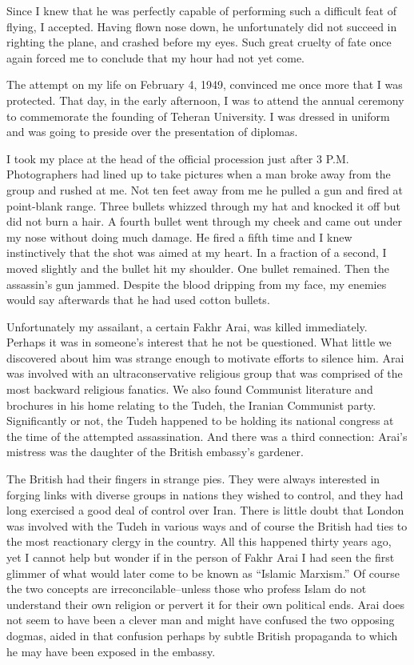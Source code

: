 Since I knew that he was perfectly capable of performing such a difficult feat of flying, I accepted. Having flown nose down, he unfortunately did not succeed in righting the plane, and crashed before my eyes. Such great cruelty of fate once again forced me to conclude that my hour had not yet come. 

The attempt on my life on February 4, 1949, convinced me once more that I was protected. That day, in the early afternoon, I was to attend the annual ceremony to commemorate the founding of Teheran University. I was dressed in uniform and was going to preside over the presentation of diplomas. 

I took my place at the head of the official procession just after 3 P.M. Photographers had lined up to take pictures when a man broke away from the group and rushed at me. Not ten feet away from me he pulled a gun and fired at point-blank range. Three bullets whizzed through my hat and knocked it off but did not burn a hair. A fourth bullet went through my cheek and came out under my nose without doing much damage. He fired a fifth time and I knew instinctively that the shot was aimed at my heart. In a fraction of a second, I moved slightly and the bullet hit my shoulder. One bullet remained. Then the assassin's gun jammed. Despite the blood dripping from my face, my enemies would say afterwards that he had used cotton bullets. 

Unfortunately my assailant, a certain Fakhr Arai, was killed immediately. Perhaps it was in someone's interest that he not be questioned. What little we discovered about him was strange enough to motivate efforts to silence him. Arai was involved with an ultraconservative religious group that was comprised of the most backward religious fanatics. We also found Communist literature and brochures in his home relating to the Tudeh, the Iranian Communist party. Significantly or not, the Tudeh happened to be holding its national congress at the time of the attempted assassination. And there was a third connection: Arai's mistress was the daughter of the British embassy's gardener. 

The British had their fingers in strange pies. They were always interested in forging links with diverse groups in nations they wished to control, and they had long exercised a good deal of control over Iran. There is little doubt that London was involved with the Tudeh in various ways and of course the British had ties to the most reactionary clergy in the country. All this happened thirty years ago, yet I cannot help but wonder if in the person of Fakhr Arai I had seen the first glimmer of what would later come to be known as “Islamic Marxism.” Of course the two concepts are irreconcilable--unless those who profess Islam do not understand their own religion or pervert it for their own political ends. Arai does not seem to have been a clever man and might have confused the two opposing dogmas, aided in that confusion perhaps by subtle British propaganda to which he may have been exposed in the embassy. 

